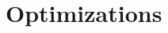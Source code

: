 \section{Optimizations}
\label{colors:optimizations}

%


\begin{comment}
This section details key optimizations for colored e-graphs, addressing challenges encountered when applying operations such as e-matching and rebuilding.
These optimizations target issues like handling e-nodes across multiple layers, inefficient rebuild processes, duplicate results in e-matching, and e-node re-additions. 
We'll first outline these issues before presenting solutions.    
\end{comment}

